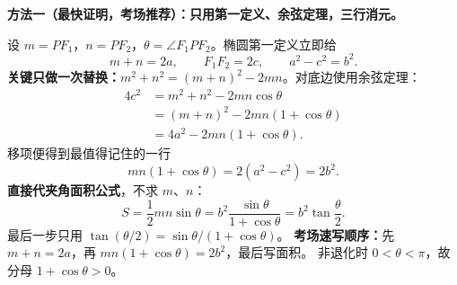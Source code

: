 \begin{proofbox}
\textbf{方法一（最快证明，考场推荐）：只用第一定义、余弦定理，三行消元。}

设 $m=PF_1$，$n=PF_2$，$\theta=\angle F_1PF_2$。椭圆第一定义立即给
\[
 m+n=2a,\qquad F_1F_2=2c,\qquad a^2-c^2=b^2.
\]
\textbf{关键只做一次替换：}$m^2+n^2=(m+n)^2-2mn$。对底边使用余弦定理：
\[
 \begin{aligned}
 4c^2
 &=m^2+n^2-2mn\cos\theta\\
 &=(m+n)^2-2mn(1+\cos\theta)\\
 &=4a^2-2mn(1+\cos\theta).
 \end{aligned}
\]
移项便得到最值得记住的一行
\[
 \boxed{mn(1+\cos\theta)=2(a^2-c^2)=2b^2}.
\]
\textbf{直接代夹角面积公式}，不求 $m$、$n$：
\[
 \boxed{
 S=\frac12mn\sin\theta
 =b^2\frac{\sin\theta}{1+\cos\theta}
 =b^2\tan\frac\theta2}.
\]
最后一步只用 $\tan(\theta/2)=\sin\theta/(1+\cos\theta)$。
\textbf{考场速写顺序：}先 $m+n=2a$，再 $mn(1+\cos\theta)=2b^2$，最后写面积。
非退化时 $0<\theta<\pi$，故分母 $1+\cos\theta>0$。
\end{proofbox}
\clearpage

